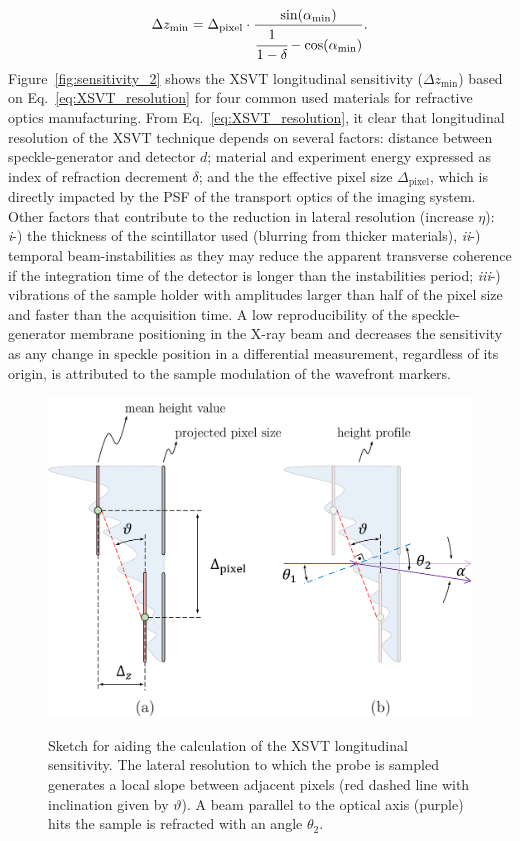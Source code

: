 \begin{refsection}
\begin{align}\label{eq:XSVT_resolution}
\Delta{z_{\text{min}}}=\Delta_\text{pixel}\cdot\frac{\sin(\alpha_\text{min})}{\cfrac{1}{1-\delta}-\cos(\alpha_\text{min})}.
\end{align}
Figure~\ref{fig:sensitivity_2} shows the XSVT longitudinal sensitivity ($\Delta{z_{\text{min}}}$) based on Eq.~\ref{eq:XSVT_resolution} for four common used materials for refractive optics manufacturing. From Eq.~\ref{eq:XSVT_resolution}, it clear that longitudinal resolution of the XSVT technique depends on several factors: distance between speckle-generator and detector $d$; material and experiment energy expressed as index of refraction decrement $\delta$; and the the effective pixel size $\Delta_\text{pixel}$, which is directly impacted by the PSF of the transport optics of the imaging system. Other factors that contribute to the reduction in lateral resolution (increase $\eta$): \textit{i}-) the thickness of the scintillator used (blurring from thicker materials), \textit{ii}-) temporal beam-instabilities as they may reduce the apparent transverse coherence if the integration time of the detector is longer than the instabilities period; \textit{iii}-) vibrations of the sample holder with amplitudes larger than half of the pixel size and faster than the acquisition time. A low reproducibility of the speckle-generator membrane positioning in the X-ray beam and decreases the sensitivity as any change in speckle position in a differential measurement, regardless of its origin, is attributed to the sample modulation of the wavefront markers.  

\begin{figure}[t]
        \centering
        {\includegraphics[width=0.5\linewidth]{figures/ch04b/sensitivity.pdf}}
        \caption[XSVT sensitivity calculation sketch]{Sketch for aiding the calculation of the XSVT longitudinal sensitivity. The lateral resolution to which the probe is sampled generates a local slope between adjacent pixels (red dashed line with inclination given by $\vartheta$). A beam parallel to the optical axis (purple) hits the sample is refracted with an angle $\theta_2$.}\label{fig:sensitivity}
\end{figure}


\end{refsection}
